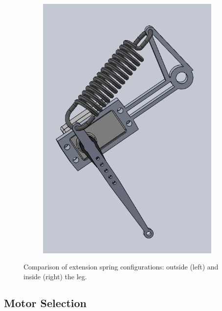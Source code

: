 \begin{figure}[h!]
\begin{subfigure}[b]{0.45\textwidth}
        \label{fig:extension_spring_outside}
    \end{subfigure}
    \hfill
    \begin{subfigure}[b]{0.45\textwidth}
        \includegraphics[width=\textwidth]{Images/extension_spring_inside.png}

        \label{fig:extension_spring_inside}
    \end{subfigure}
    \caption{Comparison of extension spring configurations: outside (left) and inside (right) the leg.}
    \label{fig:extension_spring_CAD}
\end{figure}

\subsection{Motor Selection}
\label{sec:motor_selection}

